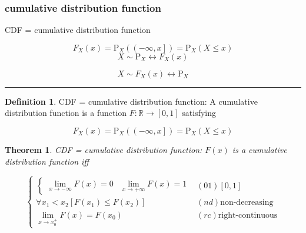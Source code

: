 \documentclass[
]{book}
\newtheorem{theorem}{Theorem}[chapter]
\theoremstyle{definition}
\newtheorem{definition}{Definition}[chapter]
\theoremstyle{definition}
\theoremstyle{definition}
\theoremstyle{definition}
\theoremstyle{remark}
\begin{document}
\subsubsection{cumulative distribution function}\label{cumulative-distribution-function}

CDF = cumulative distribution function

\[
F_{{\scriptscriptstyle X}}\left(x\right)=\mathrm{P}_{{\scriptscriptstyle X}}\left(\left(-\infty,x\right]\right)=\mathrm{P}_{{\scriptscriptstyle X}}\left(X\le x\right)
\]
\[
X\sim\mathrm{P}_{{\scriptscriptstyle X}}\leftrightarrow F_{{\scriptscriptstyle X}}\left(x\right)
\]

\[
X\sim F_{{\scriptscriptstyle X}}\left(x\right)\leftrightarrow\mathrm{P}_{{\scriptscriptstyle X}}
\]

\begin{center}\rule{0.5\linewidth}{0.5pt}\end{center}

\begin{definition}
\protect\hypertarget{def:unnamed-chunk-5}{}\label{def:unnamed-chunk-5}CDF = cumulative distribution function: A cumulative distribution function is a function \(F:\mathbb{R} \rightarrow \left[0,1\right]\) satisfying
\end{definition}

\[
F_{{\scriptscriptstyle X}}\left(x\right)=\mathrm{P}_{{\scriptscriptstyle X}}\left(\left(-\infty,x\right]\right)=\mathrm{P}_{{\scriptscriptstyle X}}\left(X\le x\right)
\]

\begin{theorem}
\protect\hypertarget{thm:unnamed-chunk-6}{}\label{thm:unnamed-chunk-6}CDF = cumulative distribution function: \(F\left(x\right)\) is a cumulative distribution function iff
\end{theorem}

\[
\begin{cases}
\begin{cases}
\lim\limits _{x\rightarrow-\infty}F\left(x\right)=0 & \lim\limits _{x\rightarrow+\infty}F\left(x\right)=1\end{cases} & \left(01\right)\left[0,1\right]\\
\forall x_{{\scriptscriptstyle 1}}<x_{{\scriptscriptstyle 2}}\left[F\left(x_{{\scriptscriptstyle 1}}\right)\le F\left(x_{{\scriptscriptstyle 2}}\right)\right] & \left(nd\right)\text{non-decreasing}\\
\lim\limits _{x\rightarrow x_{{\scriptscriptstyle 0}}^{+}}F\left(x\right)=F\left(x_{{\scriptscriptstyle 0}}\right) & \left(rc\right)\text{right-continuous}
\end{cases}
\]
\end{document}
